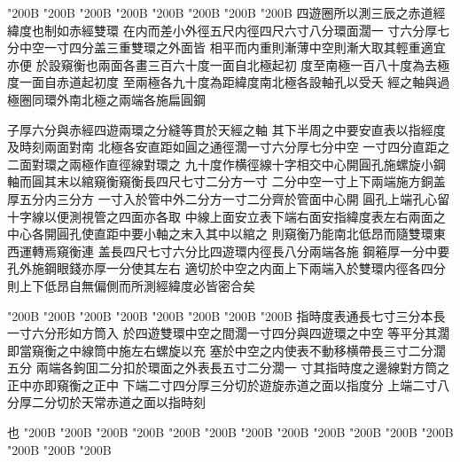 \begin{正文}
\char"200B\relax{}
\char"200B\relax{}
\char"200B\relax{}
\char"200B\relax{}
\char"200B\relax{}
\char"200B\relax{}
\char"200B\relax{}
\char"200B\relax{}
四遊圈所以測三辰之赤道經緯度也制如赤經雙環
在内而差小外徑五尺内徑四尺六寸八分環面濶一
寸六分厚七分中空一寸四分盖三重雙環之外面皆
相平而内重則漸薄中空則漸大取其輕重適宜亦便
於設窺衡也兩面各畫三百六十度一面自北極起初
度至南極一百八十度為去極度一面自赤道起初度
至兩極各九十度為距緯度南北極各設軸孔以受夭
經之軸與過極圈同環外南北極之兩端各施扁圓鋼
\par
子厚六分與赤經四遊兩環之分縫等貫於天經之軸
其下半周之中要安直表以指經度及時刻兩面對南
北極各安直距如圓之通徑濶一寸六分厚七分中空
一寸四分直距之二面對環之兩極作直徑線對環之
九十度作横徑線十字相交中心開圓孔施螺旋小鋼
軸而圓其末以綰窺衡窺衡長四尺七寸二分方一寸
二分中空一寸上下兩端施方銅盖厚五分内三分方
一寸入於管中外二分方一寸二分齊於管面中心開
圓孔上端孔心留十字線以便測視管之四面亦各取
中線上面安立表下端右面安指緯度表左右兩面之
中心各開圓孔使直距中要小軸之末入其中以綰之
則窺衡乃能南北低昂而隨雙環東西運轉焉窺衡連
盖長四尺七寸六分比四遊環内徑長八分兩端各施
鋼篐厚一分中要孔外施鋼眼錢亦厚一分使其左右
適切於中空之内面上下兩端入於雙環内徑各四分
則上下低昂自無偏側而所測經緯度必皆密合矣
\par
\end{正文}\clearpage
{}
\begin{正文}
\char"200B\relax{}
\char"200B\relax{}
\char"200B\relax{}
\char"200B\relax{}
\char"200B\relax{}
\char"200B\relax{}
\char"200B\relax{}
\char"200B\relax{}
指時度表通長七寸三分本長一寸六分形如方筒入
於四遊雙環中空之間濶一寸四分與四遊環之中空
等平分其濶即當窺衡之中線筒中施左右螺旋以充
塞於中空之内使表不動移横帶長三寸二分濶五分
兩端各鉤囬二分扣於環面之外表長五寸二分濶一
寸其指時度之邊線對方筒之正中亦即窺衡之正中
下端二寸四分厚三分切於遊旋赤道之面以指度分
上端二寸八分厚二分切於天常赤道之面以指時刻
\par
也
\char"200B\relax{}
\char"200B\relax{}
\char"200B\relax{}
\char"200B\relax{}
\char"200B\relax{}
\char"200B\relax{}
\char"200B\relax{}
\char"200B\relax{}
\char"200B\relax{}
\char"200B\relax{}
\char"200B\relax{}
\char"200B\relax{}
\char"200B\relax{}
\char"200B\relax{}
\char"200B\relax
\par
\end{正文}\clearpage
